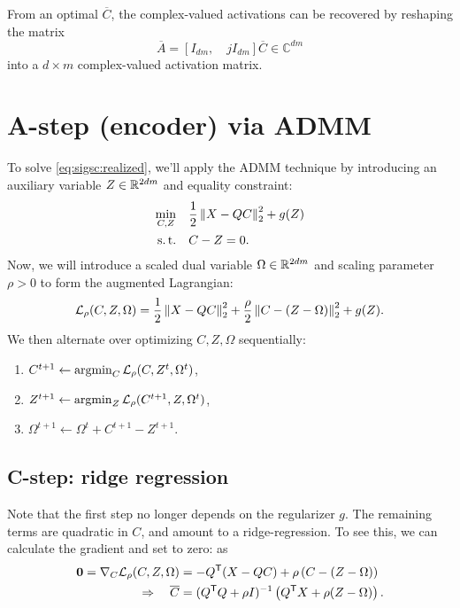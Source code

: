 \documentclass{article}
\renewcommand{\C}{\ensuremath{\mathbb{C}}}
\begin{document}
From an optimal $\overline{C}$, the complex-valued activations can be recovered by reshaping the matrix
\[
\overline{A} = \left[I_{dm}, \quad j I_{dm}\right] \overline{C} \in \C^{dm}
\]
into a $d\times m$ complex-valued activation matrix.

\section{A-step (encoder) via ADMM}
To solve \autoref{eq:sigsc:realized}, we'll apply the ADMM technique by introducing an auxiliary variable $Z \in \mathbb{R}^{2dm}$ and equality constraint:
\begin{align}
\min_{C, Z} \quad & \frac{1}{2} \left\|X - QC\right\|_2^2 + g(Z)\notag\\
\operatorname{s.t.} \quad & C - Z = 0.\label{eq:sigsc:admm}
\end{align}
Now, we will introduce a scaled dual variable $\Omega \in \mathbb{R}^{2dm}$ and scaling parameter $\rho>0$ to form the augmented Lagrangian:
\begin{align}
\mathcal{L}_\rho(C, Z, \Omega) = \frac{1}{2}\left\|X - QC\right\|_2^2 + \frac{\rho}{2}\left\|C - (Z - \Omega)\right\|_2^2 + g(Z).\label{eq:sigsc:auglag}
\end{align}
We then alternate over optimizing $C, Z, \Omega$ sequentially:
\begin{enumerate}
\item $C^{t+1} \leftarrow \operatorname*{argmin}_C \mathcal{L}_\rho(C, Z^t, \Omega^t)$,
\item $Z^{t+1} \leftarrow \operatorname*{argmin}_Z \mathcal{L}_\rho(C^{t+1}, Z, \Omega^t)$,
\item $\Omega^{t+1} \leftarrow \Omega^{t} + C^{t+1} - Z^{t+1}$.
\end{enumerate}

\subsection{C-step: ridge regression}
Note that the first step no longer depends on the regularizer $g$.  The remaining terms are
quadratic in $C$, and amount to a ridge-regression.  To see this, we can calculate the gradient and set to zero:
as
\begin{align*}
\mathbf{0} = \nabla_C \mathcal{L}_\rho(C, Z, \Omega) &= -Q^\mathsf{T} (X - QC) + \rho\left(C - (Z - \Omega) \right)\\
\Rightarrow \quad \overline{C} &= (Q^\mathsf{T} Q + \rho I)^{-1} \left(Q^\mathsf{T} X + \rho (Z - \Omega)\right).
\end{align*}
\end{document}
